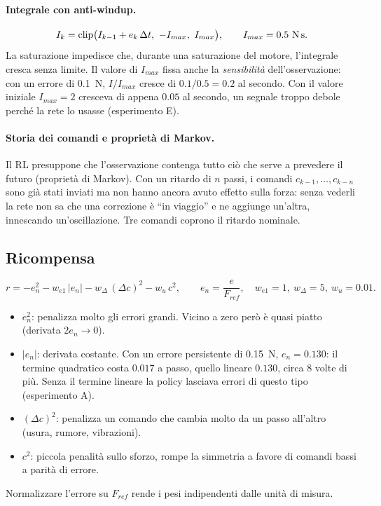 \documentclass[11pt,a4paper]{article}
\begin{document}
\paragraph{Integrale con anti-windup.}
\begin{equation}
I_k = \mathrm{clip}\big(I_{k-1} + e_k\,\Delta t,\ -I_{max},\ I_{max}\big),\qquad I_{max} = 0.5\ \text{N\,s}.
\end{equation}
La saturazione impedisce che, durante una saturazione del motore, l'integrale cresca senza limite.
Il valore di $I_{max}$ fissa anche la \emph{sensibilità} dell'osservazione: con un errore di 0.1~N,
$I/I_{max}$ cresce di $0.1/0.5 = 0.2$ al secondo. Con il valore iniziale $I_{max} = 2$ cresceva di
appena $0.05$ al secondo, un segnale troppo debole perché la rete lo usasse (esperimento E).

\paragraph{Storia dei comandi e proprietà di Markov.}
Il RL presuppone che l'osservazione contenga tutto ciò che serve a prevedere il futuro (proprietà di
Markov). Con un ritardo di $n$ passi, i comandi $c_{k-1},\dots,c_{k-n}$ sono già stati inviati ma non
hanno ancora avuto effetto sulla forza: senza vederli la rete non sa che una correzione è ``in
viaggio'' e ne aggiunge un'altra, innescando un'oscillazione. Tre comandi coprono il ritardo nominale.

\subsection{Ricompensa}
\begin{equation}
r = -e_n^2 - w_{e1}\,|e_n| - w_{\Delta}\,(\Delta c)^2 - w_u\,c^2,
\qquad e_n = \frac{e}{F_{ref}},\quad w_{e1} = 1,\ w_\Delta = 5,\ w_u = 0.01 .
\end{equation}
\begin{itemize}
\item $e_n^2$: penalizza molto gli errori grandi. Vicino a zero però è quasi piatto (derivata $2e_n\to0$).
\item $|e_n|$: derivata costante. Con un errore persistente di 0.15~N, $e_n = 0.130$:
  il termine quadratico costa $0.017$ a passo, quello lineare $0.130$, circa 8 volte di più.
  Senza il termine lineare la policy lasciava errori di questo tipo (esperimento A).
\item $(\Delta c)^2$: penalizza un comando che cambia molto da un passo all'altro (usura, rumore, vibrazioni).
\item $c^2$: piccola penalità sullo sforzo, rompe la simmetria a favore di comandi bassi a parità di errore.
\end{itemize}
Normalizzare l'errore su $F_{ref}$ rende i pesi indipendenti dalle unità di misura.
\end{document}
